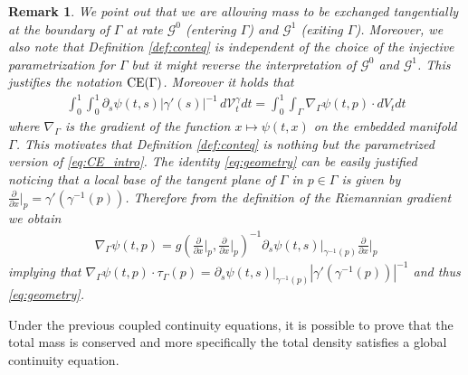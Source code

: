 \documentclass{article}
\newtheorem{remark}[theorem]{Remark}
\begin{document}
\begin{remark}
We point out that we are allowing mass to be exchanged tangentially at the boundary of $\Gamma$ at rate $\mathcal{G}^0$ (entering $\Gamma$) and $\mathcal{G}^1$ (exiting $\Gamma$). Moreover, we also note that Definition \ref{def:conteq} is independent of the choice of the injective parametrization for $\Gamma$ but it might reverse the interpretation of $\mathcal{G}^0$ and $\mathcal{G}^1$. This justifies the notation ${\rm CE}(\Gamma)$. Moreover it holds that
\begin{align}\label{eq:geometry}
    \int_0^1\int_0^1 \partial_s \psi(t,s) |\gamma'(s)|^{-1} \, d\mathcal{V}_t^\gamma dt = \int_0^1\int_\Gamma \nabla_\Gamma \psi(t,p) \cdot dV_t dt
\end{align}
where $\nabla_\Gamma$ is the gradient of the function $x \mapsto \psi(t,x)$ on the embedded manifold $\Gamma$. This motivates that Definition \ref{def:conteq} is nothing but the parametrized version of \eqref{eq:CE_intro}. The identity \eqref{eq:geometry} can be easily justified noticing that a local base of the tangent plane of $\Gamma$ in $p \in \Gamma$ is given by $\frac{\partial}{\partial x}\vert_p = \gamma'(\gamma^{-1}(p))$. Therefore from the definition of the Riemannian gradient we obtain
\begin{align}
\nabla_\Gamma \psi(t,p) = g\left(\frac{\partial}{\partial x}\vert_p, \frac{\partial}{\partial x}\vert_p\right)^{-1}\partial_s \psi(t,s)\vert_{\gamma^{-1}(p)} \frac{\partial}{\partial x}\vert_p 
\end{align}
implying that $\nabla_\Gamma \psi(t,p) \cdot \tau_\Gamma(p) = \partial_s \psi(t,s)\vert_{\gamma^{-1}(p)} |\gamma'(\gamma^{-1}(p))|^{-1}$ and thus \eqref{eq:geometry}.
\end{remark}



Under the previous coupled continuity equations, it is possible to prove that the total mass is conserved and more specifically the total density satisfies a global continuity equation.
\end{document}

